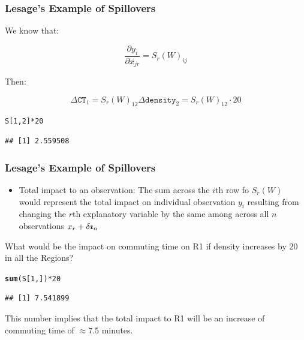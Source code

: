 \documentclass[english,10pt]{beamer}\usepackage[]{graphicx}\usepackage[]{xcolor}
\makeatletter
\newcommand{\hlnum}[1]{\textcolor[rgb]{0.686,0.059,0.569}{#1}}%
\newcommand{\hlopt}[1]{\textcolor[rgb]{0,0,0}{#1}}%
\newcommand{\hldef}[1]{\textcolor[rgb]{0.345,0.345,0.345}{#1}}%
\newcommand{\hlkwd}[1]{\textcolor[rgb]{0.737,0.353,0.396}{\textbf{#1}}}%
\newenvironment{kframe}{%
 \def\at@end@of@kframe{}%
 \ifinner\ifhmode%
  \def\at@end@of@kframe{\end{minipage}}%
  \begin{minipage}{\columnwidth}%
 \fi\fi%
 \def\FrameCommand##1{\hskip\@totalleftmargin \hskip-\fboxsep
 \colorbox{shadecolor}{##1}\hskip-\fboxsep
     \hskip-\linewidth \hskip-\@totalleftmargin \hskip\columnwidth}%
 \MakeFramed {\advance\hsize-\width
   \@totalleftmargin\z@ \linewidth\hsize
   \@setminipage}}%
 {\par\unskip\endMakeFramed%
 \at@end@of@kframe}
\newenvironment{knitrout}{}{} %
\makeatother
\begin{document}
\begin{frame}[fragile]
  \frametitle{Lesage's Example of Spillovers}
   We know that:
   
   \begin{equation}
    \frac{\partial y_i}{\partial x_{jr}} =  S_r(W)_{ij}
   \end{equation}
   
   Then:
   
  \begin{equation}
   \Delta \texttt{CT}_1 = S_r(W)_{12} \Delta \texttt{density}_{2} =  S_r(W)_{12} \cdot 20
   \end{equation}
   
\begin{knitrout}
\color{fgcolor}\begin{kframe}
\begin{alltt}
 \hldef{S[}\hlnum{1}\hldef{,}\hlnum{2}\hldef{]} \hlopt{*} \hlnum{20}
\end{alltt}
\begin{verbatim}
## [1] 2.559508
\end{verbatim}
\end{kframe}
\end{knitrout}
   
\end{frame}


\begin{frame}[fragile]
  \frametitle{Lesage's Example of Spillovers}
    \begin{itemize}
      \item \alert{Total impact to an observation}: The sum across the $i$th row fo $S_r(W)$ would represent the total impact on individual observation $y_i$ resulting from changing the $r$th explanatory variable by the same among across all $n$ observations $x_r + \delta \bm\imath_n$
    \end{itemize}
    
    What would be the impact on commuting time on R1 if density increases by 20 in all the Regions?
\begin{knitrout}
\color{fgcolor}\begin{kframe}
\begin{alltt}
 \hlkwd{sum}\hldef{(S[}\hlnum{1}\hldef{, ])} \hlopt{*} \hlnum{20}
\end{alltt}
\begin{verbatim}
## [1] 7.541899
\end{verbatim}
\end{kframe}
\end{knitrout}
   
   This number implies that the total impact to R1 will be an increase of commuting time of $\approx 7.5$ minutes. 
   
\end{frame}
\end{document}
